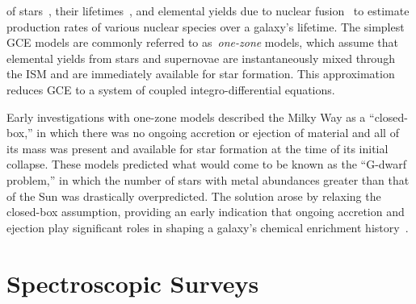 \documentclass[main.tex]{subfiles}
\begin{document}
\begin{doublespace}
of stars~\citep[e.g.,][]{Salpeter1955, Kroupa2001, Chabrier2003}, their
lifetimes~\citep[e.g.,][]{Larson1974, Maeder1989, Hurley2000}, and elemental
yields due to nuclear fusion~\citep[e.g.,][]{Woosley1995, Iwamoto1999,
Karakas2016} to estimate production rates of various nuclear species over a
galaxy's lifetime.
The simplest GCE models are commonly referred to as~\textit{one-zone} models,
which assume that elemental yields from stars and supernovae are instantaneously
mixed through the ISM and are immediately available for star formation.
This approximation reduces GCE to a system of coupled integro-differential
equations.
\par
Early investigations with one-zone models described the Milky Way as a
``closed-box,'' in which there was no ongoing accretion or ejection of material
and all of its mass was present and available for star formation at the time of
its initial collapse.
These models predicted what would come to be known as the ``G-dwarf problem,''
in which the number of stars with metal abundances greater than that of the Sun
was drastically overpredicted.
The solution arose by relaxing the closed-box assumption, providing an early
indication that ongoing accretion and ejection play significant roles in
shaping a galaxy's chemical enrichment history~\citep[e.g.,][]{Larson1972,
Chiosi1980}.

\section{Spectroscopic Surveys}
\label{main:sec:intro:surveys}


\end{doublespace}
\end{document}
